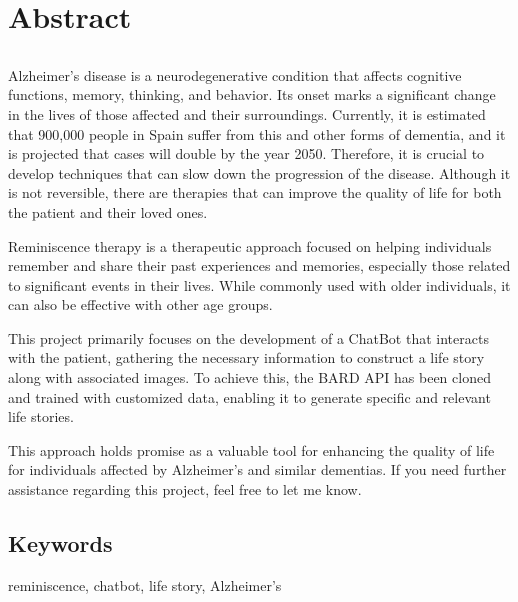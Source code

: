 \chapter*{Abstract}

\section*{\tituloPortadaEngVal}

Alzheimer's disease is a neurodegenerative condition that affects cognitive functions, memory, thinking, and behavior. Its onset marks a significant change in the lives of those affected and their surroundings. Currently, it is estimated that 900,000 people in Spain suffer from this and other forms of dementia, and it is projected that cases will double by the year 2050. Therefore, it is crucial to develop techniques that can slow down the progression of the disease. Although it is not reversible, there are therapies that can improve the quality of life for both the patient and their loved ones.

Reminiscence therapy is a therapeutic approach focused on helping individuals remember and share their past experiences and memories, especially those related to significant events in their lives. While commonly used with older individuals, it can also be effective with other age groups.

This project primarily focuses on the development of a ChatBot that interacts with the patient, gathering the necessary information to construct a life story along with associated images. To achieve this, the BARD API has been cloned and trained with customized data, enabling it to generate specific and relevant life stories.

This approach holds promise as a valuable tool for enhancing the quality of life for individuals affected by Alzheimer's and similar dementias. If you need further assistance regarding this project, feel free to let me know.

\section*{Keywords}

\noindent reminiscence, chatbot, life story, Alzheimer's



